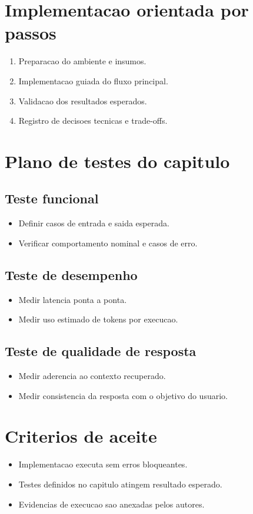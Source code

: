 \section{Implementacao orientada por passos}
\begin{enumerate}[leftmargin=*]
  \item Preparacao do ambiente e insumos.
  \item Implementacao guiada do fluxo principal.
  \item Validacao dos resultados esperados.
  \item Registro de decisoes tecnicas e trade-offs.
\end{enumerate}

\section{Plano de testes do capitulo}
\subsection{Teste funcional}
\begin{itemize}[leftmargin=*]
  \item Definir casos de entrada e saida esperada.
  \item Verificar comportamento nominal e casos de erro.
\end{itemize}

\subsection{Teste de desempenho}
\begin{itemize}[leftmargin=*]
  \item Medir latencia ponta a ponta.
  \item Medir uso estimado de tokens por execucao.
\end{itemize}

\subsection{Teste de qualidade de resposta}
\begin{itemize}[leftmargin=*]
  \item Medir aderencia ao contexto recuperado.
  \item Medir consistencia da resposta com o objetivo do usuario.
\end{itemize}

\section{Criterios de aceite}
\begin{itemize}[leftmargin=*]
  \item Implementacao executa sem erros bloqueantes.
  \item Testes definidos no capitulo atingem resultado esperado.
  \item Evidencias de execucao sao anexadas pelos autores.
\end{itemize}


